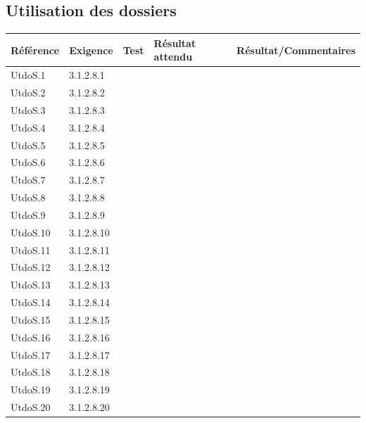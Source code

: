 \documentclass[10pt,a4paper,landscape]{report}
\begin{document}
\subsection{Utilisation des dossiers}
\begin{center}
	\bgroup
	\def\arraystretch{1.5}
	\begin{tabular}{|p{1.5cm}|p{2cm}|p{8.5cm}|p{8.5cm}|p{5cm}|}
		\hline
		\rowcolor{gris}Référence & Exigence & Test & Résultat attendu & Résultat/Commentaires\\
		\hline
		UtdoS.1 & 3.1.2.8.1 & & & \\
		\hline
		UtdoS.2 & 3.1.2.8.2 & & & \\
		\hline
		UtdoS.3 & 3.1.2.8.3 & & & \\
		\hline
		UtdoS.4 & 3.1.2.8.4 & & & \\
		\hline
		UtdoS.5 & 3.1.2.8.5 & & & \\
		\hline
		UtdoS.6 & 3.1.2.8.6 & & & \\
		\hline
		UtdoS.7 & 3.1.2.8.7 & & & \\
		\hline
		UtdoS.8 & 3.1.2.8.8 & & & \\
		\hline
		UtdoS.9 & 3.1.2.8.9 & & & \\
		\hline
		UtdoS.10 & 3.1.2.8.10 & & & \\
		\hline
		UtdoS.11 & 3.1.2.8.11 & & & \\
		\hline
		UtdoS.12 & 3.1.2.8.12 & & & \\
		\hline
		UtdoS.13 & 3.1.2.8.13 & & & \\
		\hline
		UtdoS.14 & 3.1.2.8.14 & & & \\
		\hline
		UtdoS.15 & 3.1.2.8.15 & & & \\
		\hline
		UtdoS.16 & 3.1.2.8.16 & & & \\
		\hline
		UtdoS.17 & 3.1.2.8.17 & & & \\
		\hline
		UtdoS.18 & 3.1.2.8.18 & & & \\
		\hline
		UtdoS.19 & 3.1.2.8.19 & & & \\
		\hline
		UtdoS.20 & 3.1.2.8.20 & & & \\
		\hline
	\end{tabular}
	\egroup
\end{center}
\end{document}
